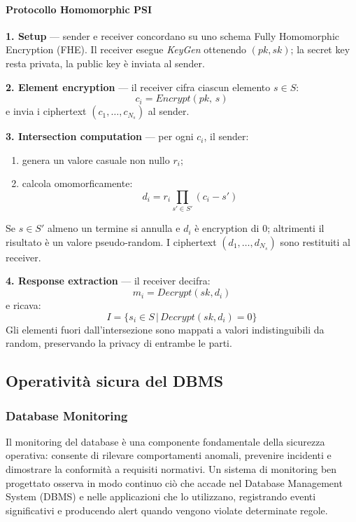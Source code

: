 \paragraph{Protocollo Homomorphic PSI}

\textbf{1. Setup} — sender e receiver concordano su uno schema Fully Homomorphic Encryption (FHE). Il receiver esegue \textit{KeyGen} ottenendo $(pk, sk)$; la secret key resta privata, la public key è inviata al sender.

\textbf{2. Element encryption} — il receiver cifra ciascun elemento $s \in S$:
\[
c_i = Encrypt(pk,\, s)
\]
e invia i ciphertext $(c_1, \dots, c_{N_s})$ al sender.

\textbf{3. Intersection computation} — per ogni $c_i$, il sender:
\begin{enumerate}
    \item genera un valore casuale non nullo $r_i$;
    \item calcola omomorficamente:
    \[
    d_i = r_i \prod_{s' \in S'} (c_i - s')
    \]
\end{enumerate}
Se $s \in S'$ almeno un termine si annulla e $d_i$ è encryption di $0$; altrimenti il risultato è un valore pseudo-random.
I ciphertext $(d_1,\dots,d_{N_s})$ sono restituiti al receiver.

\textbf{4. Response extraction} — il receiver decifra:
\[
m_i = Decrypt(sk, d_i)
\]
e ricava:
\[
I = \{ s_i \in S \,|\, Decrypt(sk, d_i) = 0 \}
\]
Gli elementi fuori dall’intersezione sono mappati a valori indistinguibili da random, preservando la privacy di entrambe le parti.

\subsection{Operatività sicura del DBMS}

\subsubsection{Database Monitoring}

Il monitoring del database è una componente fondamentale della sicurezza operativa: consente di rilevare comportamenti anomali, prevenire incidenti e dimostrare la conformità a requisiti normativi.
Un sistema di monitoring ben progettato osserva in modo continuo ciò che accade nel Database Management System (DBMS) e nelle applicazioni che lo utilizzano, registrando eventi significativi e producendo alert quando vengono violate determinate regole.

